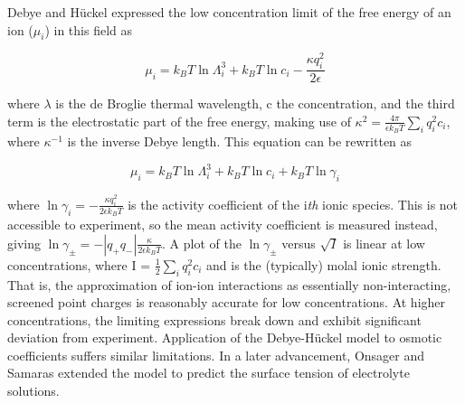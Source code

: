 \begin{intro}
    
    Debye and H\"{u}ckel expressed the low concentration limit of the free energy of an ion ($\mu_{i}$) in this field as
    
    \begin{equation}
        \mu_{i} = k_{B}T\ln\Lambda_{i}^{3} + k_{B}T\ln c_{i} - \frac{\kappa q_{i}^{2}}{2\epsilon}
    \end{equation}
    
    \noindent where $\lambda$ is the de Broglie thermal wavelength, c the concentration, and the third term is the electrostatic part of the free energy,
    making use of $\kappa^{2} = \frac{4\pi}{\epsilon k_{B}T}\sum_{i}q_{i}^{2}c_{i}$, where $\kappa^{-1}$ is the inverse Debye length. This equation can be rewritten as
    
    \begin{equation}
        \mu_{i} = k_{B}T\ln\Lambda_{i}^{3} + k_{B}T\ln c_{i} + k_{B}T\ln\gamma_{i}
    \end{equation}
    
    \noindent where $\ln\gamma_{i} = -\frac{\kappa q_{i}^{2}}{2\epsilon k_{B}T}$ is the activity coefficient of the i\emph{th} ionic species. This is not accessible to 
    experiment, so the mean activity coefficient is measured instead, giving $\ln\gamma_{\pm} = -\left|q_{+}q_{-}\right|\frac{\kappa}{2\epsilon k_{B}T}$. A plot of the
    $\ln\gamma_{\pm}$ versus $\sqrt{I}$ is linear at low concentrations, where I = $\frac{1}{2}\sum_{i}q_{i}^{2}c_{i}$ and is the (typically) molal ionic strength. That
    is, the approximation of ion-ion interactions as essentially non-interacting, screened point charges is reasonably accurate for low concentrations. At higher 
    concentrations, the limiting expressions break down and exhibit significant deviation from experiment. Application of the Debye-H\"{u}ckel model to osmotic coefficients 
    suffers similar limitations. In a later advancement, Onsager and Samaras extended the model to predict the surface tension of electrolyte solutions\cite{onsager1934surface}.
    

\end{intro}
